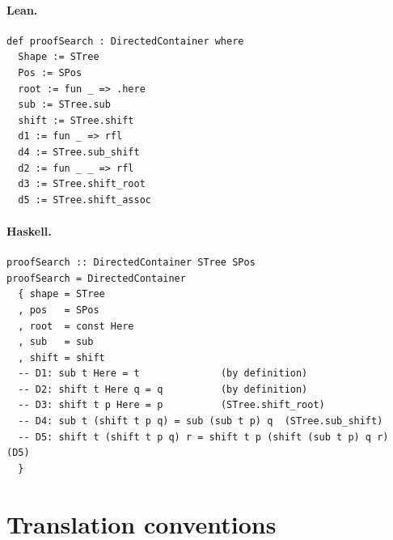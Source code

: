 \documentclass[11pt,a4paper]{article}
\begin{document}
\paragraph{Lean.}
\begin{lstlisting}[style=lean]
def proofSearch : DirectedContainer where
  Shape := STree
  Pos := SPos
  root := fun _ => .here
  sub := STree.sub
  shift := STree.shift
  d1 := fun _ => rfl
  d4 := STree.sub_shift
  d2 := fun _ _ => rfl
  d3 := STree.shift_root
  d5 := STree.shift_assoc
\end{lstlisting}

\paragraph{Haskell.}
\begin{lstlisting}[style=haskell]
proofSearch :: DirectedContainer STree SPos
proofSearch = DirectedContainer
  { shape = STree
  , pos   = SPos
  , root  = const Here
  , sub   = sub
  , shift = shift
  -- D1: sub t Here = t              (by definition)
  -- D2: shift t Here q = q          (by definition)
  -- D3: shift t p Here = p          (STree.shift_root)
  -- D4: sub t (shift t p q) = sub (sub t p) q  (STree.sub_shift)
  -- D5: shift t (shift t p q) r = shift t p (shift (sub t p) q r)  (D5)
  }
\end{lstlisting}


\section{Translation conventions}
\end{document}

